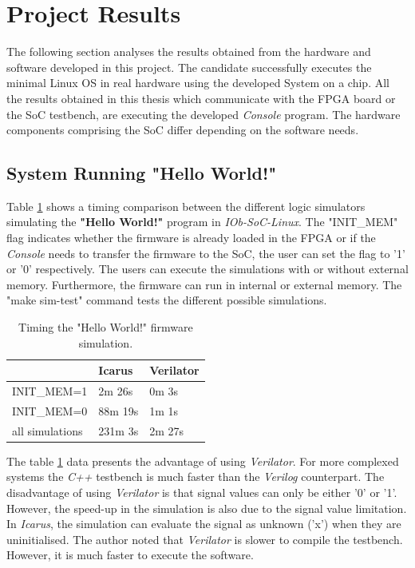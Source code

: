 \section{Project Results}
\label{sec:project_results}
The following section analyses the results obtained from the hardware and software developed in this project. The candidate successfully executes the minimal Linux OS in real hardware using the developed System on a chip. All the results obtained in this thesis which communicate with the FPGA board or the SoC testbench, are executing the developed \textit{Console} program. The hardware components comprising the SoC differ depending on the software needs.

\subsection{System Running "Hello World!"}

Table \ref{tab:hello_sim} shows a timing comparison between the different logic simulators simulating the \textbf{"Hello World!"} program in \textit{IOb-SoC-Linux}. The "INIT\_MEM" flag indicates whether the firmware is already loaded in the FPGA or if the \textit{Console} needs to transfer the firmware to the SoC, the user can set the flag to '1' or '0' respectively. The users can execute the simulations with or without external memory. Furthermore, the firmware can run in internal or external memory. The "make sim-test" command tests the different possible simulations.

\begin{table}[!ht]
    \centering
    \begin{tabular}{l|ll|}
    \cline{2-3}
                                          & \multicolumn{1}{l|}{\textbf{Icarus}}  & \textbf{Verilator} \\ \hline
    \multicolumn{1}{|l|}{INIT\_MEM=1}     & \multicolumn{1}{l|}{2m 26s}           & 0m 3s              \\ \hline
    \multicolumn{1}{|l|}{INIT\_MEM=0}     & \multicolumn{1}{l|}{88m 19s}          & 1m 1s              \\ \hline
    \multicolumn{1}{|l|}{all simulations} & \multicolumn{1}{l|}{231m 3s}          & 2m 27s             \\ \hline
    \end{tabular}
    \caption{Timing the "Hello World!" firmware simulation.}
    \label{tab:hello_sim}
\end{table}

The table \ref{tab:hello_sim} data presents the advantage of using \textit{Verilator}. For more complexed systems the \textit{C++} testbench is much faster than the \textit{Verilog} counterpart. The disadvantage of using \textit{Verilator} is that signal values can only be either '0' or '1'. However, the speed-up in the simulation is also due to the signal value limitation. In \textit{Icarus}, the simulation can evaluate the signal as unknown ('x') when they are uninitialised. The author noted that \textit{Verilator} is slower to compile the testbench. However, it is much faster to execute the software.

